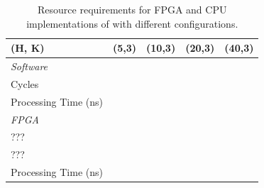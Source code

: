 \begin{table}
\begin{center}
\small
\begin{tabular}{ l l l l l } 
\toprule
(H, K) & (5,3) & (10,3) & (20,3) & (40,3) \\
\midrule
\emph{Software} & & & & \\
\cmidrule{1-1}
Cycles & & & & \\
Processing Time (ns) & & & & \\
\midrule
\emph{FPGA} & & & & \\
\cmidrule{1-1}
??? & & & & \\
??? & & & & \\
Processing Time (ns) & & & & \\
\bottomrule

\end{tabular}
\caption{Resource requirements for FPGA and CPU implementations of \OurSys with different configurations.}
\label{tab:microbenchmarks}
\end{center}
\end{table}


